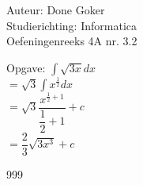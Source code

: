 \documentclass[a4paper]{article}
\begin{document}
  
\noindent \large Auteur: Done Goker \\
\noindent \large Studierichting: Informatica\\
\noindent \large Oefeningenreeks 4A nr. 3.2\\

\medskip

\normalsize

Opgave:
$\displaystyle\int \sqrt{3x}dx$ \\

$= \sqrt{3} \displaystyle\int x ^{\tfrac{1}{2}} dx$ \\

$= \sqrt{3} \dfrac{x ^{\tfrac{1}{2} + 1}}{\dfrac{1}{2} + 1} + c$ \\

$= \dfrac{2}{3}\sqrt{3 x^3} + c$ \\

\begin{thebibliography}{999}
\end{thebibliography}
\end{document}
